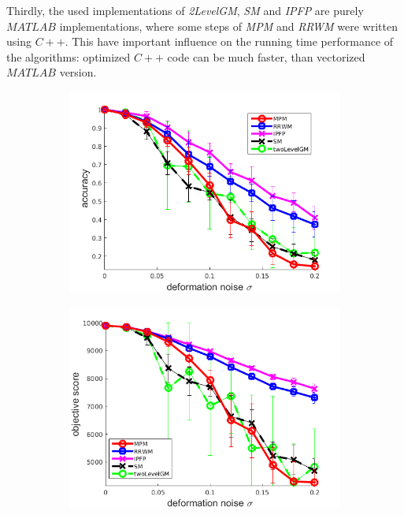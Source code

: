 Thirdly, the used implementations of \emph{2LevelGM}, \emph{SM} and \emph{IPFP} are purely $MATLAB$ implementations, where some steps of \emph{MPM} and \emph{RRWM} were written using $C++$. This have important influence on the running time performance of the algorithms: optimized $C++$ code can be much faster, than vectorized $MATLAB$ version.
\begin{figure}[h] 
	\begin{subfigure}[b]{0.3\textwidth}
		\centering
		\includegraphics[scale=0.25]{"chapter3/fig/SyntheticTest/descr/Results_v4.3.3/Test2/accuracy_avg10t"} 
	\end{subfigure}
	\begin{subfigure}[b]{0.3\textwidth}
		\centering
		\includegraphics[scale=0.25]{"chapter3/fig/SyntheticTest/descr/Results_v4.3.3/Test2/score_avg10t"} 

\end{subfigure}
\end{figure}
